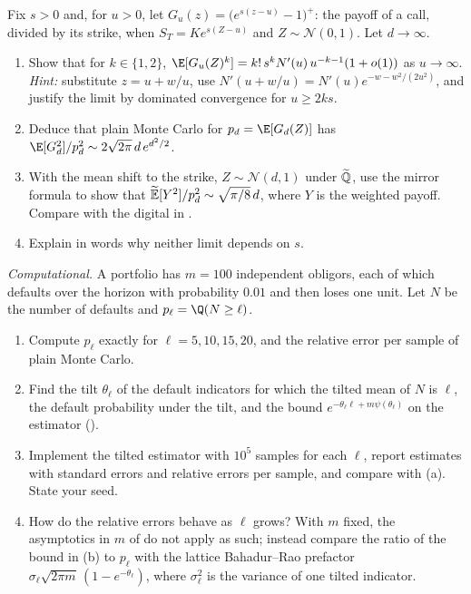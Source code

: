 \begin{exercise}\label{ex:is-call-asymptotics}
\hard Fix $s>0$ and, for $u>0$, let $G_u(z)=\big(e^{s(z-u)}-1\big)^+$: the payoff of a call,
divided by its strike, when $S_T=Ke^{s(Z-u)}$ and $Z\sim\mathcal N(0,1)$. Let $d\to\infty$.
\begin{enumerate}[label=(\alph*)]
  \item Show that for $k\in\{1,2\}$,
    $\E[G_u(Z)^k]=k!\,s^kN'(u)\,u^{-k-1}(1+o(1))$ as $u\to\infty$. \emph{Hint:} substitute
    $z=u+w/u$, use $N'(u+w/u)=N'(u)e^{-w-w^2/(2u^2)}$, and justify the limit by dominated
    convergence for $u\ge2ks$.
  \item Deduce that plain Monte Carlo for $p_d=\E[G_d(Z)]$ has
    $\E[G_d^2]/p_d^2\sim2\sqrt{2\pi}\,d\,e^{d^2/2}$.
  \item With the mean shift to the strike, $Z\sim\mathcal N(d,1)$ under $\widetilde{\mathbb Q}$, use the mirror formula
     to show that $\widetilde{\mathbb E}[Y^2]/p_d^2\sim\sqrt{\pi/8}\,d$, where $Y$ is the
    weighted payoff. Compare with the digital in .
  \item Explain in words why neither limit depends on $s$.
\end{enumerate}
\end{exercise}

\begin{exercise}\label{ex:is-credit}
\medium \emph{Computational.} A portfolio has $m=100$ independent obligors, each of which
defaults over the horizon with probability $0.01$ and then loses one unit. Let $N$ be the number
of defaults and $p_\ell=\Q(N\ge\ell)$.
\begin{enumerate}[label=(\alph*)]
  \item Compute $p_\ell$ exactly for $\ell=5,10,15,20$, and the relative error per sample of plain
    Monte Carlo.
  \item Find the tilt $\theta_\ell$ of the default indicators for which the tilted mean of $N$ is
    $\ell$, the default probability under the tilt, and the bound
    $e^{-\theta_\ell\ell+m\psi(\theta_\ell)}$ on the estimator ().
  \item Implement the tilted estimator with $10^5$ samples for each $\ell$, report estimates with
    standard errors and relative errors per sample, and compare with (a). State your seed.
  \item How do the relative errors behave as $\ell$ grows? With $m$ fixed, the asymptotics in
    $m$ of  do not apply as such; instead compare the ratio of the bound
    in (b) to $p_\ell$ with the lattice Bahadur--Rao prefactor
    $\sigma_\ell\sqrt{2\pi m}\,(1-e^{-\theta_\ell})$, where $\sigma_\ell^2$ is the variance of one
    tilted indicator.
\end{enumerate}
\end{exercise}

